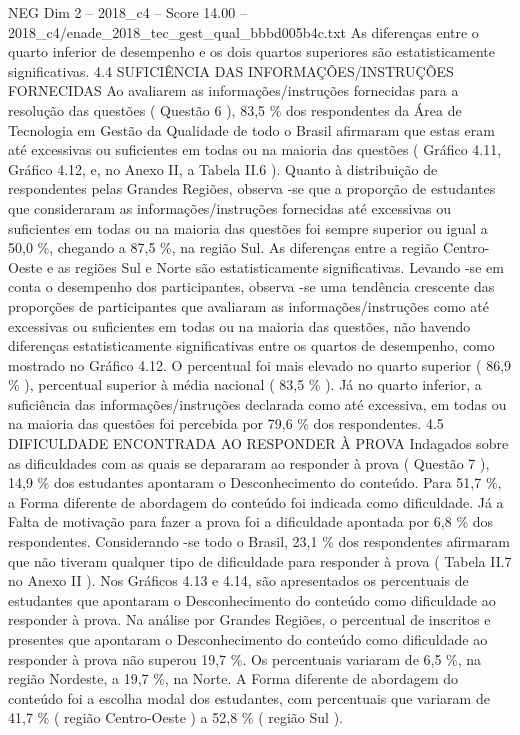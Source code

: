 \begin{textsample}{NEG Dim 2 – 2018\_c4 – Score 14.00 – 2018\_c4/enade\_2018\_tec\_gest\_qual\_bbbd005b4c.txt}
As diferenças entre o quarto inferior de desempenho e os dois quartos superiores são estatisticamente significativas. 4.4 SUFICIÊNCIA DAS INFORMAÇÕES/INSTRUÇÕES FORNECIDAS Ao avaliarem as informações/instruções fornecidas para a resolução das questões ( Questão 6 ), 83,5 \% dos respondentes da Área de Tecnologia em Gestão da Qualidade de todo o Brasil afirmaram que estas eram até excessivas ou suficientes em todas ou na maioria das questões ( Gráfico 4.11, Gráfico 4.12, e, no Anexo II, a Tabela II.6 ).
Quanto à distribuição de respondentes pelas Grandes Regiões, observa -se que a proporção de estudantes que consideraram as informações/instruções fornecidas até excessivas ou suficientes em todas ou na maioria das questões foi sempre superior ou igual a 50,0 \%, chegando a 87,5 \%, na região Sul.
As diferenças entre a região Centro-Oeste e as regiões Sul e Norte são estatisticamente significativas.
Levando -se em conta o desempenho dos participantes, observa -se uma tendência crescente das proporções de participantes que avaliaram as informações/instruções como até excessivas ou suficientes em todas ou na maioria das questões, não havendo diferenças estatisticamente significativas entre os quartos de desempenho, como mostrado no Gráfico 4.12.
O percentual foi mais elevado no quarto superior ( 86,9 \% ), percentual superior à média nacional ( 83,5 \% ).
Já no quarto inferior, a suficiência das informações/instruções declarada como até excessiva, em todas ou na maioria das questões foi percebida por 79,6 \% dos respondentes. 4.5 DIFICULDADE ENCONTRADA AO RESPONDER À PROVA Indagados sobre as dificuldades com as quais se depararam ao responder à prova ( Questão 7 ), 14,9 \% dos estudantes apontaram o Desconhecimento do conteúdo.
Para 51,7 \%, a Forma diferente de abordagem do conteúdo foi indicada como dificuldade.
Já a Falta de motivação para fazer a prova foi a dificuldade apontada por 6,8 \% dos respondentes.
Considerando -se todo o Brasil, 23,1 \% dos respondentes afirmaram que não tiveram qualquer tipo de dificuldade para responder à prova ( Tabela II.7 no Anexo II ).
Nos Gráficos 4.13 e 4.14, são apresentados os percentuais de estudantes que apontaram o Desconhecimento do conteúdo como dificuldade ao responder à prova.
Na análise por Grandes Regiões, o percentual de inscritos e presentes que apontaram o Desconhecimento do conteúdo como dificuldade ao responder à prova não superou 19,7 \%.
Os percentuais variaram de 6,5 \%, na região Nordeste, a 19,7 \%, na Norte.
A Forma diferente de abordagem do conteúdo foi a escolha modal dos estudantes, com percentuais que variaram de 41,7 \% ( região Centro-Oeste ) a 52,8 \% ( região Sul ).

\end{textsample}
